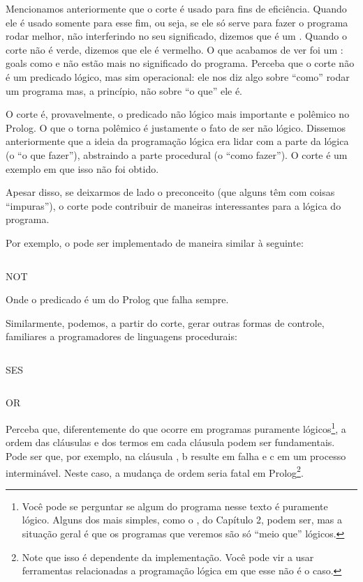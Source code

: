 \documentclass{article}
\begin{document}
Mencionamos anteriormente que o corte é usado para fins de
eficiência. Quando ele é usado somente para esse fim, ou seja, se ele
só serve para fazer o programa rodar melhor, não interferindo no seu
significado, dizemos que é um .  Quando o corte
não é verde, dizemos que ele é vermelho. O que acabamos de ver foi um
: goals como  e
 não estão mais no significado do programa. Perceba que
o corte não é um predicado lógico, mas sim operacional: ele nos diz
algo sobre ``como'' rodar um programa mas, a princípio, não sobre ``o
que'' ele é.

O corte é, provavelmente, o predicado não lógico mais importante e
polêmico no Prolog. O que o torna polêmico é justamente o fato de ser
não lógico. Dissemos anteriormente que a ideia da programação lógica
era lidar com a parte da lógica (o ``o que fazer''), abstraindo a
parte procedural (o ``como fazer''). O corte é um exemplo em que isso
não foi obtido.

Apesar disso, se deixarmos de lado o preconceito (que alguns têm com
coisas ``impuras''), o corte pode
contribuir de maneiras interessantes para a lógica do programa.

Por exemplo, o  pode ser implementado de maneira similar
à seguinte:

\begin{listing}
  \inputminted{prolog}{../Exemplos/Cap4/prog3_not.pl}
  \caption{NOT}
\end{listing}

Onde o predicado  é um  do Prolog que
falha sempre.

Similarmente, podemos, a partir do corte, gerar outras formas de
controle, familiares a programadores de linguagens procedurais:

\begin{listing}
  \inputminted{prolog}{../Exemplos/Cap4/prog4_ifthenelse.pl}
  \caption{SES}
\end{listing}

\begin{listing}
  \inputminted{prolog}{../Exemplos/Cap4/prog5_or.pl}
  \caption{OR}
\end{listing}

Perceba que, diferentemente do que ocorre em programas puramente
lógicos\footnote{Você pode se perguntar se algum do programa nesse
  texto é puramente lógico. Alguns dos mais simples, como o
  , do Capítulo 2, %
  podem ser, mas a situação geral é que os programas
  que veremos são só ``meio que'' lógicos.}, a ordem das cláusulas e
dos termos em cada cláusula podem ser fundamentais. Pode ser que, por
exemplo, na cláusula , b resulte em falha e c em
um processo interminável. Neste caso, a mudança de ordem seria
fatal em Prolog\footnote{Note que isso é dependente da implementação. Você pode
  vir a usar ferramentas relacionadas a programação lógica em que esse
  não é o caso.}.
\end{document}
